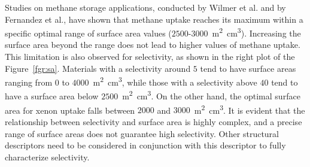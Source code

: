 \documentclass[main.tex]{subfiles}
\begin{document}
Studies on methane storage applications, conducted by Wilmer et al.\autocite{Wilmer_2012} and by Fernandez et al.\autocite{Fernandez_2013}, have shown that methane uptake reaches its maximum within a specific optimal range of surface area values ($2500$-$3000$~\si{\square\meter\cubic\centi\meter}). Increasing the surface area beyond the range does not lead to higher values of methane uptake. This limitation is also observed for selectivity, as shown in the right plot of the Figure~\ref{fgr:sa}. Materials with a selectivity around $5$ tend to have surface areas ranging from $0$ to $4000$~\si{\square\meter\cubic\centi\meter}, while those with a selectivity above $40$ tend to have a surface area below $2500$~\si{\square\meter\cubic\centi\meter}. On the other hand, the optimal surface area for xenon uptake falls between $2000$ and $3000$~\si{\square\meter\cubic\centi\meter}. It is evident that the relationship between selectivity and surface area is highly complex, and a precise range of surface areas does not guarantee high selectivity. Other structural descriptors need to be considered in conjunction with this descriptor to fully characterize selectivity. 
\end{document}
